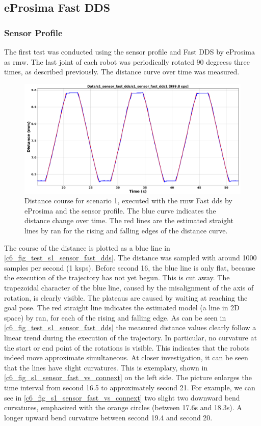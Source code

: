 \subsection{eProsima Fast DDS}
\subsubsection{Sensor Profile}
The first test was conducted using the sensor profile and Fast DDS by eProsima as \gls{rmw}. The last joint of each robot was periodically rotated 90 degreess three times, as described previously. The distance curve over time was measured.\newline
\begin{figure}[H]
	\centering
	\includegraphics[width=1\textwidth]{Figures/c6/s1/s1_sensor_fast_dds.pdf}
	\caption{Distance course for scenario 1, executed with the \gls{rmw} Fast \gls{dds} by eProsima and the sensor profile. The blue curve indicates the distance change over time. The red lines are the estimated straight lines by \gls{ran} for the rising and falling edges of the distance curve.}
	\label{c6_fig_test_s1_sensor_fast_dds}
\end{figure}
The course of the distance is plotted as a blue line in \autoref{c6_fig_test_s1_sensor_fast_dds}. The distance was sampled with around 1000 samples per second (1 \si{ksps}). Before second 16, the blue line is only flat, because the execution of the trajectory has not yet begun. This is cut away. The trapezoidal character of the blue line, caused by the misalignment of the axis of rotation, is clearly visible. The plateaus are caused by waiting at reaching the goal pose. The red straight line indicates the estimated model (a line in 2D space) by \gls{ran}, for each of the rising and falling edge. As can be seen in \autoref{c6_fig_test_s1_sensor_fast_dds} the measured distance values clearly follow a linear trend during the execution of the trajectory. In particular, no curvature at the start or end point of the rotations is visible. This indicates that the robots indeed move approximate simultaneous. 
At closer investigation, it can be seen that the lines have slight curvatures. This is exemplary, shown in \autoref{c6_fig_s1_sensor_fast_vs_connext} on the left side. The picture enlarges the time interval from second 16.5 to approximately second 21. For example, we can see in \autoref{c6_fig_s1_sensor_fast_vs_connext} two slight two downward bend curvatures, emphasized with the orange circles (between 17.6s and 18.3s). A longer upward bend curvature between second 19.4 and second 20.


